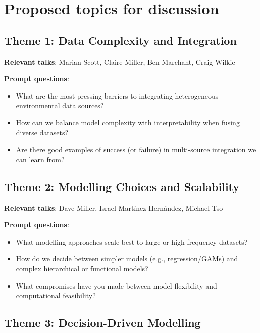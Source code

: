 \documentclass[
  11pt,
  letterpaper,
  DIV=11,
  numbers=noendperiod]{scrartcl}
\begin{document}
\newpage

\section{Proposed topics for
discussion}\label{proposed-topics-for-discussion}

\subsection{Theme 1: Data Complexity and
Integration}\label{theme-1-data-complexity-and-integration}

\textbf{Relevant talks}: Marian Scott, Claire Miller, Ben Marchant,
Craig Wilkie

\textbf{Prompt questions}:

\begin{itemize}
\item
  What are the most pressing barriers to integrating heterogeneous
  environmental data sources?
\item
  How can we balance model complexity with interpretability when fusing
  diverse datasets?
\item
  Are there good examples of success (or failure) in multi-source
  integration we can learn from?
\end{itemize}

\subsection{Theme 2: Modelling Choices and
Scalability}\label{theme-2-modelling-choices-and-scalability}

\textbf{Relevant talks}: Dave Miller, Israel Martínez-Hernández, Michael
Tso

\textbf{Prompt questions}:

\begin{itemize}
\item
  What modelling approaches scale best to large or high-frequency
  datasets?
\item
  How do we decide between simpler models (e.g., regression/GAMs) and
  complex hierarchical or functional models?
\item
  What compromises have you made between model flexibility and
  computational feasibility?
\end{itemize}

\subsection{Theme 3: Decision-Driven
Modelling}\label{theme-3-decision-driven-modelling}
\end{document}
